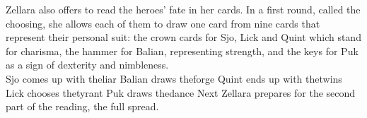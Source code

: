 Zellara also offers to read the heroes' fate in her cards. In a first round, called the choosing, she allows each of them to draw one card from nine cards that represent their personal suit: the crown cards for Sjo, Lick and Quint which stand for charisma, the hammer for Balian, representing strength, and the keys for Puk as a sign of dexterity and nimbleness.\\

Sjo comes up with theliar Balian draws theforge Quint ends up with thetwins Lick chooses thetyrant Puk draws thedance Next Zellara prepares for the second part of the reading, the full spread.\\

